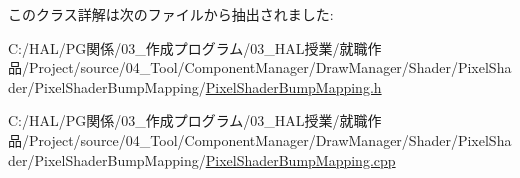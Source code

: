 このクラス詳解は次のファイルから抽出されました\+:\begin{DoxyCompactItemize}
\item 
C\+:/\+H\+A\+L/\+P\+G関係/03\+\_\+作成プログラム/03\+\_\+\+H\+A\+L授業/就職作品/\+Project/source/04\+\_\+\+Tool/\+Component\+Manager/\+Draw\+Manager/\+Shader/\+Pixel\+Shader/\+Pixel\+Shader\+Bump\+Mapping/\mbox{\hyperlink{_pixel_shader_bump_mapping_8h}{Pixel\+Shader\+Bump\+Mapping.\+h}}\item 
C\+:/\+H\+A\+L/\+P\+G関係/03\+\_\+作成プログラム/03\+\_\+\+H\+A\+L授業/就職作品/\+Project/source/04\+\_\+\+Tool/\+Component\+Manager/\+Draw\+Manager/\+Shader/\+Pixel\+Shader/\+Pixel\+Shader\+Bump\+Mapping/\mbox{\hyperlink{_pixel_shader_bump_mapping_8cpp}{Pixel\+Shader\+Bump\+Mapping.\+cpp}}\end{DoxyCompactItemize}
